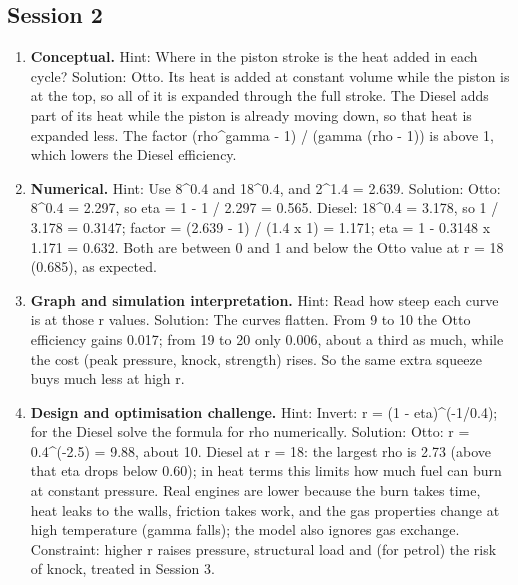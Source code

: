 \documentclass[11pt,a4paper]{article}
\begin{document}
\subsection*{Session 2}
\begin{enumerate}[nosep]
\item \textbf{Conceptual.} Hint: Where in the piston stroke is the heat added in each cycle? Solution: Otto. Its heat is added at constant volume while the piston is at the top, so all of it is expanded through the full stroke. The Diesel adds part of its heat while the piston is already moving down, so that heat is expanded less. The factor (rho\textasciicircum{}gamma - 1) / (gamma (rho - 1)) is above 1, which lowers the Diesel efficiency.
\item \textbf{Numerical.} Hint: Use 8\textasciicircum{}0.4 and 18\textasciicircum{}0.4, and 2\textasciicircum{}1.4 = 2.639. Solution: Otto: 8\textasciicircum{}0.4 = 2.297, so eta = 1 - 1 / 2.297 = 0.565. Diesel: 18\textasciicircum{}0.4 = 3.178, so 1 / 3.178 = 0.3147; factor = (2.639 - 1) / (1.4 x 1) = 1.171; eta = 1 - 0.3148 x 1.171 = 0.632. Both are between 0 and 1 and below the Otto value at r = 18 (0.685), as expected.
\item \textbf{Graph and simulation interpretation.} Hint: Read how steep each curve is at those r values. Solution: The curves flatten. From 9 to 10 the Otto efficiency gains 0.017; from 19 to 20 only 0.006, about a third as much, while the cost (peak pressure, knock, strength) rises. So the same extra squeeze buys much less at high r.
\item \textbf{Design and optimisation challenge.} Hint: Invert: r = (1 - eta)\textasciicircum{}(-1/0.4); for the Diesel solve the formula for rho numerically. Solution: Otto: r = 0.4\textasciicircum{}(-2.5) = 9.88, about 10. Diesel at r = 18: the largest rho is 2.73 (above that eta drops below 0.60); in heat terms this limits how much fuel can burn at constant pressure. Real engines are lower because the burn takes time, heat leaks to the walls, friction takes work, and the gas properties change at high temperature (gamma falls); the model also ignores gas exchange. Constraint: higher r raises pressure, structural load and (for petrol) the risk of knock, treated in Session 3.
\end{enumerate}
\end{document}
